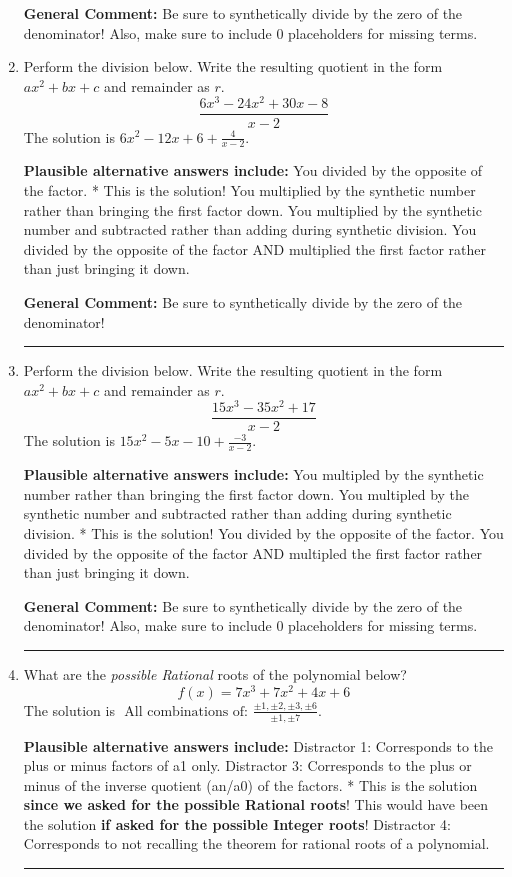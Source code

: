 \documentclass{extbook}[14pt]
\newcommand{\litem}[1]{\item #1

\rule{\textwidth}{0.4pt}}
\begin{document}
\begin{enumerate}
{\textbf{General Comment:} Be sure to synthetically divide by the zero of the denominator! Also, make sure to include 0 placeholders for missing terms.
}
\litem{
Perform the division below. Write the resulting quotient in the form $ax^2+bx+c$ and remainder as $r$.
\[ \frac{6x^{3} -24 x^{2} +30 x -8}{x -2} \]The solution is \( 6x^{2} -12 x + 6 + \frac{4}{x -2} \).\begin{enumerate}[label=\Alph*.]
\textbf{Plausible alternative answers include:} You divided by the opposite of the factor.
* This is the solution!
 You multiplied by the synthetic number rather than bringing the first factor down.
 You multiplied by the synthetic number and subtracted rather than adding during synthetic division.
 You divided by the opposite of the factor AND multiplied the first factor rather than just bringing it down.
\end{enumerate}

\textbf{General Comment:} Be sure to synthetically divide by the zero of the denominator!
}
\litem{
Perform the division below. Write the resulting quotient in the form $ax^2+bx+c$ and remainder as $r$.
\[ \frac{15x^{3} -35 x^{2} + 17}{x -2} \]The solution is \( 15x^{2} -5 x -10 + \frac{-3}{x -2} \).\begin{enumerate}[label=\Alph*.]
\textbf{Plausible alternative answers include:} You multipled by the synthetic number rather than bringing the first factor down.
 You multipled by the synthetic number and subtracted rather than adding during synthetic division.
* This is the solution!
 You divided by the opposite of the factor.
 You divided by the opposite of the factor AND multipled the first factor rather than just bringing it down.
\end{enumerate}

\textbf{General Comment:} Be sure to synthetically divide by the zero of the denominator! Also, make sure to include 0 placeholders for missing terms.
}
\litem{
What are the \textit{possible Rational} roots of the polynomial below?
\[ f(x) = 7x^{3} +7 x^{2} +4 x + 6 \]The solution is \( \text{ All combinations of: }\frac{\pm 1,\pm 2,\pm 3,\pm 6}{\pm 1,\pm 7} \).\begin{enumerate}[label=\Alph*.]
\textbf{Plausible alternative answers include:} Distractor 1: Corresponds to the plus or minus factors of a1 only.
 Distractor 3: Corresponds to the plus or minus of the inverse quotient (an/a0) of the factors. 
* This is the solution \textbf{since we asked for the possible Rational roots}!
This would have been the solution \textbf{if asked for the possible Integer roots}!
 Distractor 4: Corresponds to not recalling the theorem for rational roots of a polynomial.
\end{enumerate}

}
\end{enumerate}
\end{document}
